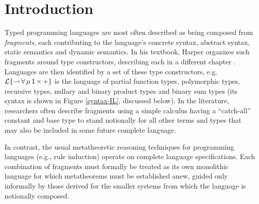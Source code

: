 \documentclass[10pt,preprint]{sigplanconf}
\begin{document}
\section{Introduction}\label{intro}
Typed programming languages are most often described as being composed from \emph{fragments}, each contributing to the language's concrete syntax, abstract syntax, static semantics and dynamic semantics. 
In his textbook, Harper organizes such fragments around type constructors, describing each in a different chapter \cite{pfpl}. Languages are then identified by a set of these type constructors, e.g. $\mathcal{L}\{{\rightharpoonup}\,{\forall}\,{\mu}\,{{\sf 1}}\,{\times}\,{+}\}$ is the language of partial function types, polymorphic types, recursive types, nullary and binary product types and binary sum types (its syntax is shown in Figure \ref{syntax-IL}, discussed below).
In the literature, researchers often describe fragments using a simple calculus having a ``catch-all'' constant and base type to stand notionally for all other terms and types that may also be included in some future complete language.

In contrast, the usual metatheoretic reasoning techniques for programming languages  (e.g., rule induction) operate on complete language specifications. Each {combination} of fragments must formally be treated as its own monolithic language for which  metatheorems must be established anew, guided only informally by those derived for the smaller systems from which the language is notionally composed.

\end{document}
